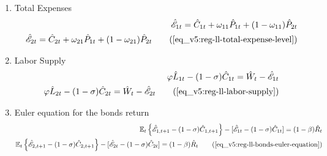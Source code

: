 \documentclass[../thesis.tex]{subfiles}
\begin{document}
{\begin{enumerate}
		
		\begin{comment}
			\item Regional Levels of Consumption and Prices
			\begin{align}
				\hat{C}_{1 1 t} - \hat{C}_{1 2 t} = \hat{P}_{2 t} - \hat{P}_{1 t} \nonumber \\
				\hat{C}_{2 1 t} - \hat{C}_{2 2 t} = \hat{P}_{2 t} - \hat{P}_{1 t} \tag{\ref{eq_v5:reg-ll-regional-consumption-and-prices}}
			\end{align}
		\end{comment}
	

		
		\item Total Expenses
		\begin{align}
			\hat{\mathscr{E}}_{1 t} = \hat{C}_{1 t} + \omega_{1 1} \hat{P}_{1 t} + (1 -\omega_{1 1}) \hat{P}_{2 t} \nonumber \\
			\hat{\mathscr{E}}_{2 t} = \hat{C}_{2 t} + \omega_{2 1} \hat{P}_{1 t} + (1 -\omega_{2 1}) \hat{P}_{2 t} \tag{\ref{eq_v5:reg-ll-total-expense-level}}
		\end{align}
		
		\item Labor Supply
		\begin{alignat}{2}
			\varphi \hat{L}_{1 t} - (1 -\sigma) \hat{C}_{1 t} = \hat{W}_t - \hat{ \mathscr{E} }_{1 t} \nonumber \\
			\varphi \hat{L}_{2 t} - (1 -\sigma) \hat{C}_{2 t} = \hat{W}_t - \hat{ \mathscr{E} }_{2 t} \tag{\ref{eq_v5:reg-ll-labor-supply}}
		\end{alignat}
		
		\item Euler equation for the bonds return
		\begin{alignat}{2}
			\E \left\{ \hat{\mathscr{E}}_{1, t+1} - (1 -\sigma)\hat{C}_{1, t+1} \right\} - [\hat{\mathscr{E}}_{1 t} - (1 -\sigma)\hat{C}_{1 t}] = (1 -\beta) \hat{R}_{t} \nonumber \\ %
			\E \left\{ \hat{\mathscr{E}}_{2, t+1} - (1 -\sigma)\hat{C}_{2, t+1} \right\} - [\hat{\mathscr{E}}_{2 t} - (1 -\sigma)\hat{C}_{2 t}] = (1 -\beta) \hat{R}_{t} \tag{\ref{eq_v5:reg-ll-bonds-euler-equation}} %
		\end{alignat}
		

\end{enumerate}}
\end{document}
